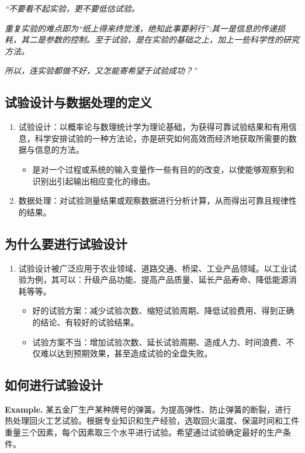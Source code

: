 \documentclass[UTF8]{ctexart}
\begin{document}
\begin{spacing}{1.5}
\par \emph{“不要看不起实验，更不要低估试验。}
\par \emph{重复实验的难点即为“纸上得来终觉浅，绝知此事要躬行”:其一是信息的传递损耗，其二是参数的控制。至于试验，是在实验的基础之上，加上一些科学性的研究方法。}
\par \emph{所以，连实验都做不好，又怎能寄希望于试验成功？”}
\end{spacing}

\subsection{试验设计与数据处理的定义}

\begin{enumerate}[•]
\item 试验设计：以概率论与数理统计学为理论基础，为获得可靠试验结果和有用信息，科学安排试验的一种方法论，亦是研究如何高效而经济地获取所需要的数据与信息的方法。
\begin{itemize}
\item 是对一个过程或系统的输入变量作一些有目的的改变，以使能够观察到和识别出引起输出相应变化的缘由。
\end{itemize}
\item 数据处理：对试验测量结果或观察数据进行分析计算，从而得出可靠且规律性的结果。
\end{enumerate}

\subsection{为什么要进行试验设计}

\begin{enumerate}[•]
 \item 试验设计被广泛应用于农业领域、道路交通、桥梁、工业产品领域。以工业试验为例，其可以：升级产品功能、提高产品质量、延长产品寿命、降低能源消耗等等。
\begin{itemize}
\item 好的试验方案：减少试验次数、缩短试验周期、降低试验费用、得到正确的结论、有较好的试验结果。
\item 试验方案不当：增加试验次数、延长试验周期、造成人力、时间浪费、不仅难以达到预期效果，甚至造成试验的全盘失败。
\end{itemize}
\end{enumerate}

\subsection{如何进行试验设计}
\textbf{Example.}
某五金厂生产某种牌号的弹簧。为提高弹性、防止弹簧的断裂，进行热处理回火工艺试验。根据专业知识和生产经验，选取回火温度、保温时间和工件重量三个因素，每个因素取三个水平进行试验。希望通过试验确定最好的生产条件。
\end{document}
